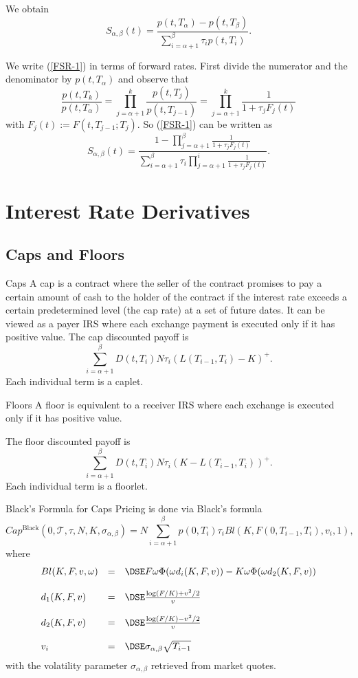 	We obtain
	\begin{equation}\label{FSR-1}
	S_{\alpha,\beta}(t)=\frac{p(t,T_{\alpha})-p(t,T_{\beta})}{\sum_{i=\alpha+1}^{\beta}\tau_ip(t,T_i)}.
	\end{equation}

	We write (\ref{FSR-1}) in terms of forward rates. First divide the numerator
	and the denominator by $p(t,T_{\alpha})$ and observe that
		$$
		\frac{p(t,T_k)}{p(t,T_{\alpha})}=
		\prod_{j=\alpha+1}^k\frac{p(t,T_j)}{p(t,T_{j-1})}=
		\prod_{j=\alpha+1}^k\frac{1}{1+\tau_jF_j(t)}
		$$
	with $F_j(t):=F(t,T_{j-1};T_j)$. So (\ref{FSR-1}) can be written as
		\begin{equation}
		S_{\alpha,\beta}(t)=
		\frac{1-\prod_{j=\alpha+1}^{\beta}\frac{1}{1+\tau_jF_j(t)}}
		{\sum_{i=\alpha+1}^{\beta}\tau_i\prod_{j=\alpha+1}^{i}\frac{1}{1+\tau_jF_j(t)}}.
		\end{equation}


\section{Interest Rate Derivatives}
\subsection{Caps and Floors}

Caps
	A cap is a contract where the seller of the contract promises to
	pay a certain amount of cash to the holder of the contract if the
	interest rate exceeds a certain predetermined level (the cap rate)
	at a set of future dates.
	It can be viewed as a payer IRS where
	each exchange payment is executed only if it has positive value.
	The cap discounted payoff is
		$$
		\sum_{i=\alpha+1}^{\beta}D(t,T_i)N\tau_i(L(T_{i-1},T_i)-K)^+.
		$$
	Each individual term is a caplet.


Floors
	A floor is
	equivalent to a receiver IRS where each exchange is executed only
	if it has positive value.

	The floor discounted payoff is
		$$
		\sum_{i=\alpha+1}^{\beta}D(t,T_i)N\tau_i(K-L(T_{i-1},T_i))^+.
		$$
	Each individual term is a floorlet.



Black's Formula for Caps
	{\small Pricing is done via Black's formula
		$$
		Cap^{\mbox{Black}}(0,{\mathcal T},\tau,N,K,\sigma_{\alpha,\beta})=
		N\sum_{i=\alpha+1}^{\beta}p(0,T_i)\tau_i Bl(K,F(0,T_{i-1},T_i),v_i,1),
		$$
	where 
		$$
		\begin{array}{lll}
		Bl(K,F,v,\omega) & = &\DSE  F\omega \Phi(\omega d_i(K,F,v))-K \omega \Phi(\omega d_2(K,F,v)) \\*[12pt]
		d_1(K,F,v) & = & \DSE \frac{\log(F/K)+v^2/2}{v} \\*[12pt]
		d_2(K,F,v) & = & \DSE \frac{\log(F/K)-v^2/2}{v}\\*[12pt]
		v_i & = & \DSE \sigma_{\alpha,\beta}\sqrt{T_{i-1}}
		\end{array}
		$$
	with the volatility parameter $\sigma_{\alpha,\beta}$
	retrieved from market quotes.}


